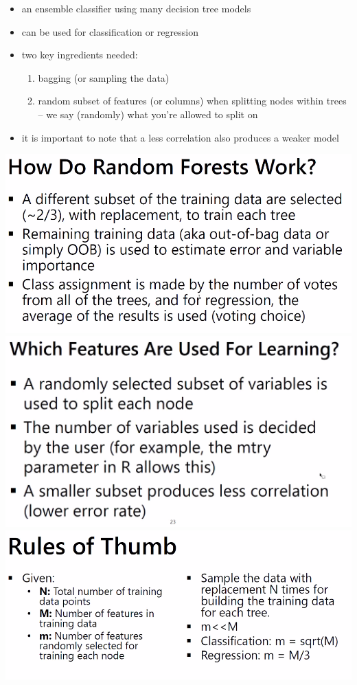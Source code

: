 \documentclass[12pt]{article}
\begin{document}
\begin{itemize}
			\begin{itemize}
				\item an ensemble classifier using many decision tree models
				\item can be used for classification or regression 
				\item two key ingredients needed:
				\begin{enumerate}
					\item bagging (or sampling the data)
					\item random subset of features (or columns) when splitting nodes within trees -- we say (randomly) what you're allowed to split on 
				\end{enumerate}
				\item it is important to note that a less correlation also produces a weaker model
			\end{itemize}
			\newpage
			{\centering \includegraphics[scale=.45]{forest.png}}
			{\centering \includegraphics[scale=.45]{choices.png}\newline}
			{\centering \includegraphics[scale=.45]{rules.png}}

\end{itemize}
\end{document}
